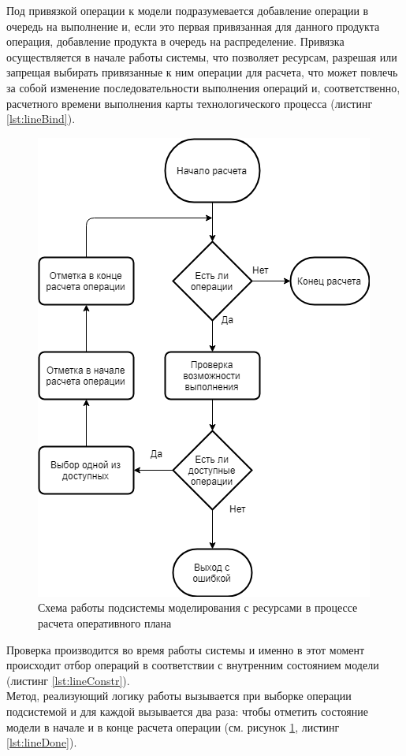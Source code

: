 \indent Под привязкой операции к модели подразумевается добавление операции в очередь на выполнение и, если это первая привязанная для данного продукта операция, добавление продукта в очередь на распределение. Привязка осуществляется в начале работы системы, что позволяет ресурсам, разрешая или запрещая выбирать привязанные к ним операции для расчета, что может повлечь за собой изменение последовательности выполнения операций и, соответственно, расчетного времени выполнения карты технологического процесса (листинг \ref{lst:lineBind}).

\begin{figure}[h]
	\centering
	\includegraphics[scale=0.6]{pics/assemblyResSchema.png}
	\caption{Схема работы подсистемы моделирования с ресурсами в процессе расчета оперативного плана}
	\label{fig:assemblyResSchema}
\end{figure}

\indent Проверка производится во время работы системы и именно в этот момент происходит отбор операций в соответствии с внутренним состоянием модели (листинг \ref{lst:lineConstr}).\\
\indent Метод, реализующий логику работы вызывается при выборке операции подсистемой и для каждой вызывается два раза: чтобы отметить состояние модели в начале и в конце расчета операции (см. рисунок \ref{fig:assemblyResSchema}, листинг \ref{lst:lineDone}).

